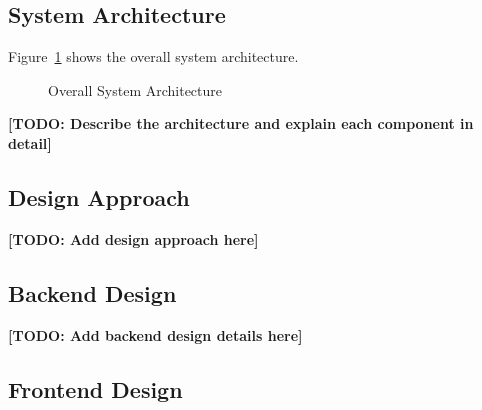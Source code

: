 
\subsection{System Architecture}


Figure~\ref{fig:system_architecture} shows the overall system architecture.

\begin{figure}[H]
  \centering
  \caption{Overall System Architecture}
  \label{fig:system_architecture}
\end{figure}

\textbf{[TODO: Describe the architecture and explain each component in detail]}

\subsection{Design Approach}


\textbf{[TODO: Add design approach here]}

\subsection{Backend Design}


\textbf{[TODO: Add backend design details here]}

\subsection{Frontend Design}


